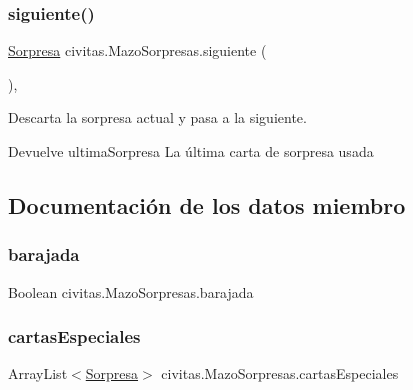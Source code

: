 \subsubsection{\texorpdfstring{siguiente()}{siguiente()}}
{\footnotesize\ttfamily \hyperlink{classcivitas_1_1Sorpresa}{Sorpresa} civitas.\+Mazo\+Sorpresas.\+siguiente (\begin{DoxyParamCaption}{ }\end{DoxyParamCaption})\hspace{0.3cm}{\ttfamily [inline]}, {\ttfamily [package]}}



Descarta la sorpresa actual y pasa a la siguiente. 

\begin{DoxyReturn}{Devuelve}
ultima\+Sorpresa La última carta de sorpresa usada 
\end{DoxyReturn}


\subsection{Documentación de los datos miembro}
\mbox{\label{classcivitas_1_1MazoSorpresas_aec96b369692f1dd8bdffbf76c333ad5f}} 
\subsubsection{\texorpdfstring{barajada}{barajada}}
{\footnotesize\ttfamily Boolean civitas.\+Mazo\+Sorpresas.\+barajada\hspace{0.3cm}{\ttfamily [private]}}

\mbox{\label{classcivitas_1_1MazoSorpresas_acd15c95f30ce89bff5b581430f6683ce}} 
\subsubsection{\texorpdfstring{cartas\+Especiales}{cartasEspeciales}}
{\footnotesize\ttfamily Array\+List$<$\hyperlink{classcivitas_1_1Sorpresa}{Sorpresa}$>$ civitas.\+Mazo\+Sorpresas.\+cartas\+Especiales\hspace{0.3cm}{\ttfamily [private]}}

